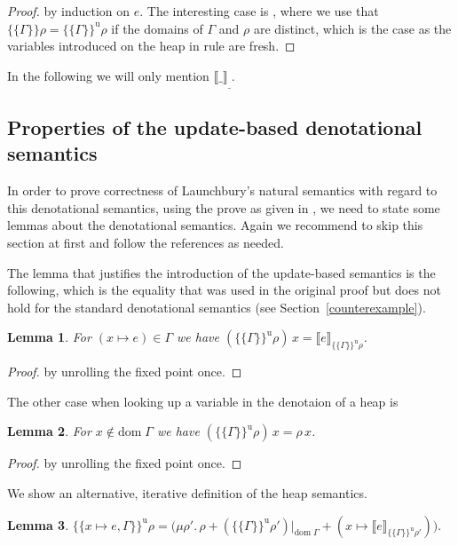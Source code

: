 \documentclass{jfp1}
\newtheorem{lemma}{Lemma}
\theoremstyle{nonumberbreak}
\newtheorem{proof}{Proof}
\newcommand{\sRule}[1]{\text{{\textsc{#1}}}}
\newcommand{\dom}[1]{\text{dom}\;#1}
\newcommand{\dsem}[2]{\llbracket #1 \rrbracket_{#2}}
\newcommand{\esem}[1]{\{\!\!\!\{#1\}\!\!\!\}}
\newcommand{\esemu}[1]{\{\!\!\!\{#1\}\!\!\!\}^{\text{u}}}
\begin{document}
\begin{proof}
by induction on $e$. The interesting case is \sRule{Let}, where we use that $\esem{\Gamma}{\rho} = \esemu{\Gamma}{\rho}$ if the domains of $\Gamma$ and $\rho$ are distinct, which is the case as the variables introduced on the heap in rule \sRule{Let} are fresh.
\end{proof}

In the following we will only mention $\dsem{\_}\_$.

\subsection{Properties of the update-based denotational semantics}
\label{updsemanticsprops}

In order to prove correctness of Launchbury's natural semantics with regard to this denotational semantics, using the prove as given in \cite{launchbury}, we need to state some lemmas about the denotational semantics. Again we recommend to skip this section at first and follow the references as needed.

The lemma that justifies the introduction of the update-based semantics is the following, which is the equality that was used in the original proof but does not hold for the standard denotational semantics (see Section~\ref{counterexample}).

\begin{lemma}
\label{lem:esemu_this}
For $(x\mapsto e)\in \Gamma$ we have $(\esemu{\Gamma}\rho)\,x = \dsem{e}{\esemu{\Gamma}\rho}$.
\end{lemma}

\begin{proof}
by unrolling the fixed point once.
\end{proof}

The other case when looking up a variable in the denotaion of a heap is

\begin{lemma}
\label{lem:esemu_other}
For $x \notin \dom\Gamma$ we have $(\esemu{\Gamma}\rho)\,x = \rho\, x$.
\end{lemma}

\begin{proof}
by unrolling the fixed point once.
\end{proof}

We show an alternative, iterative definition of the heap semantics.

\begin{lemma}
$
\esemu{x \mapsto e, \Gamma}\rho = \big(\mu \rho'.\,  \rho + (\esemu{\Gamma}{\rho'})|_{\dom\Gamma} + (x \mapsto \dsem{e}{\esemu{\Gamma}\rho'})\big).
$
\label{lem:iter}
\end{lemma}
\end{document}
